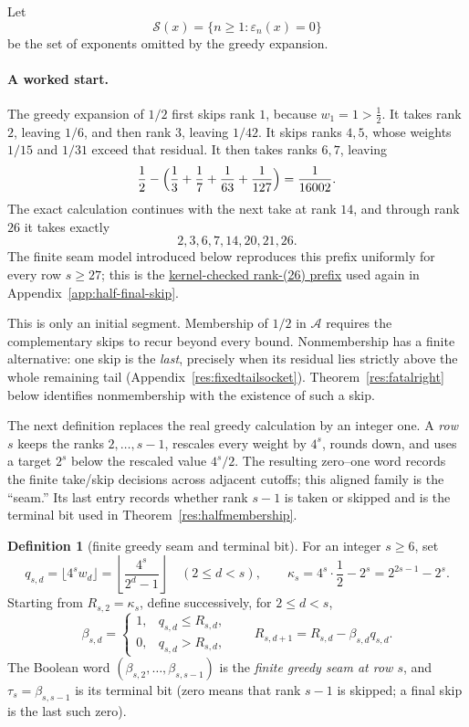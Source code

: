 \documentclass[11pt]{article}
\newcommand{\commit}{312b96c0d149ed466725c62d4ef24cfc91bca34e}
\newcommand{\repobase}{https://github.com/wcook04/plectis-lean-erdos249-257/blob/\commit}
\newcommand{\PK}{Erdos249257}
\newcommand{\lword}[4]{\href{\repobase/\PK/#1\#L#2}{#4}}
\theoremstyle{definition}
\newtheorem{definition}[theorem]{Definition}
\theoremstyle{remark}
\begin{document}
Let
\[
 \mathcal S(x)=\{n\geq1:\varepsilon_n(x)=0\}
\]
be the set of exponents omitted by the greedy expansion.

\paragraph{A worked start.}
The greedy expansion of \(1/2\) first skips rank \(1\), because
\(w_1=1>\tfrac12\).  It takes rank \(2\), leaving \(1/6\), and then rank
\(3\), leaving \(1/42\).  It skips ranks \(4,5\), whose weights \(1/15\)
and \(1/31\) exceed that residual.  It then takes ranks \(6,7\), leaving
\[
 \frac12-\Bigl(\frac13+\frac17+\frac1{63}+\frac1{127}\Bigr)
 =\frac1{16002}.
\]
The exact calculation continues with the next take at rank \(14\), and through
rank \(26\) it takes exactly
\[
 2,3,6,7,14,20,21,26.
\]
The finite seam model introduced below reproduces this prefix uniformly for
every row \(s\geq27\); this is the
\lword{HalfFinalMiddlePhaseSieve.lean}{899}{seamGreedyBits_head2367_14_20_21_26}{kernel-checked rank-(26) prefix}
used again in Appendix~\ref{app:half-final-skip}.

This is only an initial segment.  Membership of \(1/2\) in \(\mathcal A\)
requires the complementary skips to recur beyond every bound.  Nonmembership
has a finite alternative: one skip is the \emph{last}, precisely when its
residual lies strictly above the whole remaining tail
(Appendix~\ref{res:fixedtailsocket}).  Theorem~\ref{res:fatalright} below
identifies nonmembership with the existence of such a skip.

The next definition replaces the real greedy calculation by an integer one.
A \emph{row} \(s\) keeps the ranks \(2,\ldots,s-1\), rescales every weight by
\(4^s\), rounds down, and uses a target \(2^s\) below the rescaled value
\(4^s/2\).  The resulting zero--one word records the finite take/skip
decisions across adjacent cutoffs; this aligned family is the ``seam.''  Its
last entry records whether rank \(s-1\) is taken or skipped and is the terminal
bit used in Theorem~\ref{res:halfmembership}.

\begin{definition}[finite greedy seam and terminal bit]\label{def:terminal-bit}
For an integer \(s\geq6\), set
\[
 q_{s,d}=\lfloor4^sw_d\rfloor
 =\left\lfloor\frac{4^s}{2^d-1}\right\rfloor
 \quad(2\leq d<s),
 \qquad
 \kappa_s=4^s\cdot\frac12-2^s=2^{2s-1}-2^s.
\]
Starting from \(R_{s,2}=\kappa_s\), define successively, for \(2\leq d<s\),
\[
 \beta_{s,d}=
 \begin{cases}
  1,&q_{s,d}\leq R_{s,d},\\
  0,&q_{s,d}>R_{s,d},
 \end{cases}
 \qquad
 R_{s,d+1}=R_{s,d}-\beta_{s,d}q_{s,d}.
\]
The Boolean word \((\beta_{s,2},\ldots,\beta_{s,s-1})\) is the
\emph{finite greedy seam at row \(s\)}, and
\(\tau_s=\beta_{s,s-1}\) is its terminal bit (zero means that rank \(s-1\)
is skipped; a final skip is the last such zero).
\end{definition}
\end{document}
